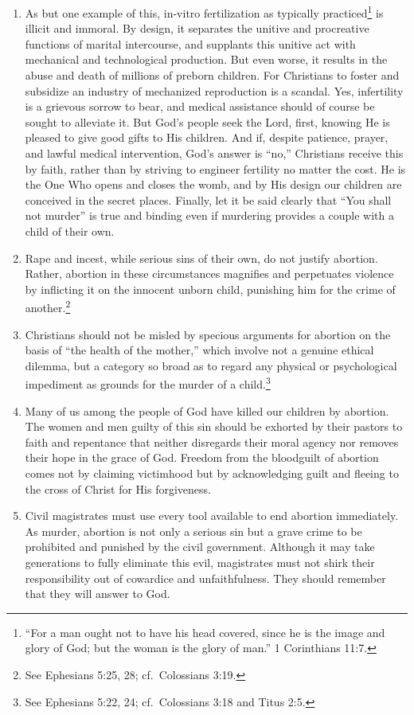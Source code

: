\documentclass[
]{book}
\begin{document}
\begin{enumerate}
\item
  As but one example of this, in-vitro fertilization as typically practiced\footnote{``For a man ought not to have his head covered, since he is the image and glory of God; but the woman is the glory of man.'' 1 Corinthians 11:7.} is illicit and immoral. By design, it separates the unitive and procreative functions of marital intercourse, and supplants this unitive act with mechanical and technological production. But even worse, it results in the abuse and death of millions of preborn children. For Christians to foster and subsidize an industry of mechanized reproduction is a scandal. Yes, infertility is a grievous sorrow to bear, and medical assistance should of course be sought to alleviate it. But God's people seek the Lord, first, knowing He is pleased to give good gifts to His children. And if, despite patience, prayer, and lawful medical intervention, God's answer is ``no,'' Christians receive this by faith, rather than by striving to engineer fertility no matter the cost. He is the One Who opens and closes the womb, and by His design our children are conceived in the secret places. Finally, let it be said clearly that ``You shall not murder'' is true and binding even if murdering provides a couple with a child of their own.
\item
  Rape and incest, while serious sins of their own, do not justify abortion. Rather, abortion in these circumstances magnifies and perpetuates violence by inflicting it on the innocent unborn child, punishing him for the crime of another.\footnote{See Ephesians 5:25, 28; cf.~Colossians 3:19.}
\item
  Christians should not be misled by specious arguments for abortion on the basis of ``the health of the mother,'' which involve not a genuine ethical dilemma, but a category so broad as to regard any physical or psychological impediment as grounds for the murder of a child.\footnote{See Ephesians 5:22, 24; cf.~Colossians 3:18 and Titus 2:5.}
\item
  Many of us among the people of God have killed our children by abortion. The women and men guilty of this sin should be exhorted by their pastors to faith and repentance that neither disregards their moral agency nor removes their hope in the grace of God. Freedom from the bloodguilt of abortion comes not by claiming victimhood but by acknowledging guilt and fleeing to the cross of Christ for His forgiveness.
\item
  Civil magistrates must use every tool available to end abortion immediately. As murder, abortion is not only a serious sin but a grave crime to be prohibited and punished by the civil government. Although it may take generations to fully eliminate this evil, magistrates must not shirk their responsibility out of cowardice and unfaithfulness. They should remember that they will answer to God.

\end{enumerate}
\end{document}
